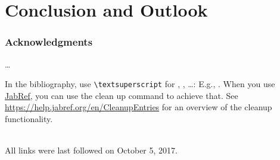 \documentclass[ngerman,runningheads,a4paper]{llncs}[2018/03/10]
\begin{document}
\section{Conclusion and Outlook}
\label{sec:outlook}
\lipsum[1-2]

\subsubsection*{Acknowledgments}
\ldots

In the bibliography, use \texttt{\textbackslash textsuperscript} for , , \ldots:
E.g., .
When you use \href{https://www.jabref.org}{JabRef}, you can use the clean up command to achieve that.
See \url{https://help.jabref.org/en/CleanupEntries} for an overview of the cleanup functionality.

\renewcommand{\bibsection}{\section*{References}} %

\begingroup
  \ifluatex
  \else
  \fi
  \small %
  
\endgroup

\ \\
%
All links were last followed on October 5, 2017.
\end{document}
